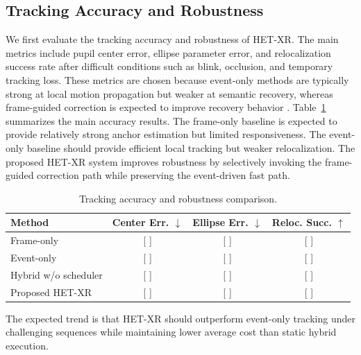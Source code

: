 \documentclass[journal]{IEEEtran}
\begin{document}
\subsection{Tracking Accuracy and Robustness}
We first evaluate the tracking accuracy and robustness of HET-XR. The main metrics include pupil center error, ellipse parameter error, and relocalization success rate after difficult conditions such as blink, occlusion, and temporary tracking loss. These metrics are chosen because event-only methods are typically strong at local motion propagation but weaker at semantic recovery, whereas frame-guided correction is expected to improve recovery behavior \cite{zhang2024swift,ding2025facet,chen2025ex}.
%
Table~\ref{tab:accuracy} summarizes the main accuracy results. The frame-only baseline is expected to provide relatively strong anchor estimation but limited responsiveness. The event-only baseline should provide efficient local tracking but weaker relocalization. The proposed HET-XR system improves robustness by selectively invoking the frame-guided correction path while preserving the event-driven fast path.
%
\begin{table}[t]
\small
\centering
\caption{Tracking accuracy and robustness comparison.}
\scriptsize
\label{tab:accuracy}
\centering
\begin{tabular}{lccc}
\hline
Method & Center Err. $\downarrow$ & Ellipse Err. $\downarrow$ & Reloc. Succ. $\uparrow$ \\
\hline
Frame-only & [ ] & [ ] & [ ] \\
Event-only & [ ] & [ ] & [ ] \\
Hybrid w/o scheduler & [ ] & [ ] & [ ] \\
Proposed HET-XR & [ ] & [ ] & [ ] \\
\hline
\end{tabular}
\end{table}
%
The expected trend is that HET-XR should outperform event-only tracking under challenging sequences while maintaining lower average cost than static hybrid execution.
\end{document}
